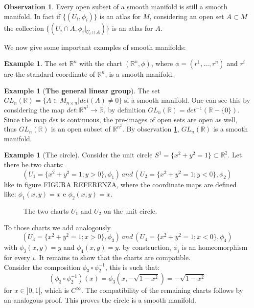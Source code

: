 \documentclass[12pt,a4paper]{report}
\theoremstyle{definition}
\theoremstyle{Theorem}
\theoremstyle{definition}
\newtheorem{Ex}[Def]{Example}
\theoremstyle{definition}
\newtheorem{Obs}[Def]{Observation}
\begin{document}
		\begin{Obs}\label{Obs:1.1.1}
			Every open subset of a smooth manifold is still a smooth manifold. In fact if $\{(U_i,\phi_i)\}$ is an atlas for $M$, considering an open set $A\subset M$ the collection $\{(U_i\cap A,\phi_i|_{U_i\cap A})\}$ is an atlas for $A$.
		\end{Obs}
		We now give some important examples of smooth manifolds:
		\begin{Ex}
			The set $\mathbb{R}^n$ with the chart $(\mathbb{R}^n,\phi)$, where $\phi=(r^1,...,r^n)$ and $r^i$ are the standard coordinate of $\mathbb{R}^n$, is a smooth manifold.
		\end{Ex}
		\begin{Ex} [\textbf{The general linear group}]\label{Ex 1.1}
			The set $GL_n(\mathbb{R})=\{A\in M_{n\times n}|det(A)\neq0\}$ si a smooth manifold. One can see this by considering the map $det:\mathbb{R}^{n^2}\rightarrow \mathbb{R}$, by definition $GL_n(\mathbb{R})=det^{-1}(\mathbb{R}-\{0\})$. Since the map $det$ is continuous, the pre-images of open sets are open as well, thus $GL_n(\mathbb{R})$ is an open subset of $\mathbb{R}^{n^2}$. By observation \ref{Obs:1.1.1}, $GL_n(\mathbb{R})$ is a smooth manifold.
		\end{Ex}
		\begin{Ex} [The circle]
			Consider the unit circle $S^1=\{x^2+y^2=1\}\subset \mathbb{R}^2$. Let there be two charts: $$(U_1=\{x^2+y^2=1;y>0\},\phi_1) \, and \,  (U_2=\{x^2+y^2=1;y<0\},\phi_2)$$ like in figure FIGURA REFERENZA, where the coordinate maps are defined like: $\phi_1(x,y)=x$ e $\phi_2(x,y)=x$.
			\begin{figure}[H]
				\centering
				\label{figura 1}
				\caption{The two charts $U_1$ and $U_2$ on the unit circle.}
			\end{figure}
			To those charts we add analogously $$(U_3=\{x^2+y^2=1;x>0\},\phi_3)\, and \, (U_4=\{x^2+y^2=1;x<0\},\phi_4)$$ with $\phi_3(x,y)=y$ and $\phi_4(x,y)=y$. by construction, $\phi_i$ is an homeomorphism for every $i$. It remains to show that the charts are compatible.\\
			Consider the composition $\phi_3\circ\phi_2^{-1}$, this is such that: $$(\phi_3\circ\phi_2^{-1})(x)=\phi_3(x,-\sqrt{1-x^2})=-\sqrt{1-x^2}$$ for $x\in ]0,1[$, which is $C^\infty$. The compatibility of the remaining charts follows by an analogous proof. This proves the circle is a smooth manifold.
		\end{Ex}
\end{document}
